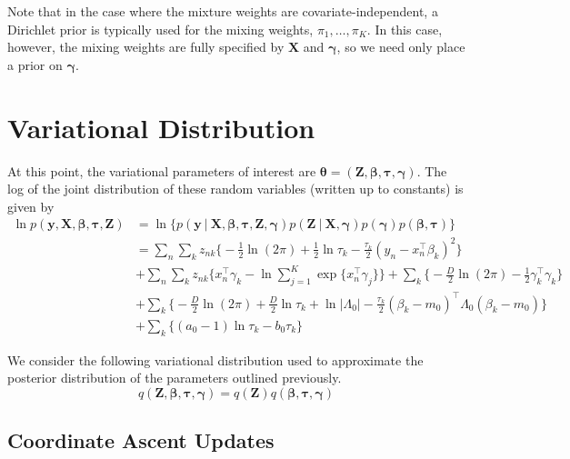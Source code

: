 \documentclass[twoside,11pt]{article}
\newcommand\given[1][]{\:#1\vert\:}
\newcommand{\transpose}[1]{#1^{\intercal}}
\newcommand{\nsum}{\sum\limits_{n}}
\newcommand{\ksum}{\sum\limits_{k}}
\newcommand{\boldbeta}{\boldsymbol\beta}
\newcommand{\boldgamma}{\boldsymbol\gamma}
\newcommand{\boldtau}{\boldsymbol\tau}
\newcommand{\sumexp}{\sum_{j=1}^{K} \exp \{ \transpose{x_n} \gamma_j \}}
\newcommand{\pr}[1]{p \left( #1 \right)}
\begin{document}
Note that in the case where the mixture weights are covariate-independent, a Dirichlet prior is typically used for the mixing weights, $\pi_1, \ldots, \pi_K$. In this case, however, the mixing weights are fully specified by $\mathbf{X}$ and $\boldgamma$, so we need only place a prior on $\boldgamma$. 


\section{Variational Distribution} \label{sec:variational}
At this point, the variational parameters of interest are $\boldsymbol \theta = (\mathbf{Z}, \boldbeta, \boldtau, \boldgamma)$. The log of the joint distribution of these random variables (written up to constants) is given by
\begin{equation} \label{eq:joint}
\begin{split}
	\ln  \pr{\mathbf{y}, \mathbf{X}, \boldbeta, \boldtau, \mathbf{Z}} &= 
	\ln \bigg\{\pr{\mathbf{y} \given \mathbf{X}, \boldsymbol\beta, \boldsymbol{\tau}, \mathbf{Z}, \boldsymbol\gamma}\pr{\mathbf{Z}\given \mathbf{X}, \boldgamma}\pr{\boldgamma}\pr{\boldbeta, \boldtau} \bigg\}\\
	&= \nsum \ksum z_{nk}\bigg\{ -\frac{1}{2}\ln(2\pi) + \frac{1}{2} \ln \tau_k - \frac{\tau_k}{2} \left( y_n - \transpose{x_n}\beta_k\right)^2 \bigg\} \\
	& + \nsum \ksum z_{nk} \bigg\{ \transpose{x_n} \gamma_k - \ln \sumexp  \bigg\} + \ksum \bigg\{ -\frac{D}{2} \ln (2\pi) - \frac{1}{2} \transpose{\gamma_k}\gamma_k \bigg\} \\
	& + \ksum  \bigg\{ -\frac{D}{2} \ln (2\pi) + \frac{D}{2} \ln \tau_k + \ln | \Lambda_0| - \frac{\tau_k}{2}\transpose{(\beta_k - m_0)} \Lambda_0 (\beta_k - m_0)\bigg\} \\
	& + \ksum \bigg\{ (a_0 - 1) \ln \tau_k - b_0 \tau_k \bigg\}
\end{split}
\end{equation}

We consider the following variational distribution used to approximate the posterior distribution of the parameters outlined previously.
\begin{equation} \label{eq:variational}
	q \left( \mathbf{Z}, \boldbeta, \boldtau, \boldgamma \right) = q(\mathbf{Z}) q(\boldbeta, \boldtau, \boldgamma)
\end{equation}

\subsection{Coordinate Ascent Updates} \label{sec:cavi}
\end{document}
